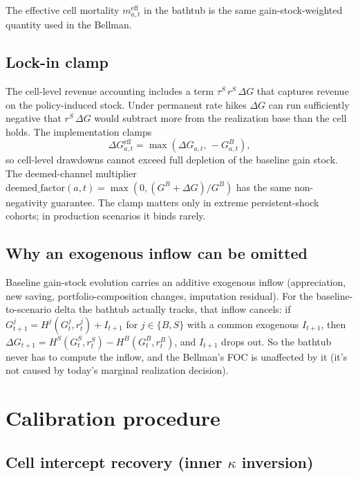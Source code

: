 \documentclass[11pt]{article}
\begin{document}
The effective cell mortality $m^{\text{eff}}_{a,t}$ in the bathtub is the
same gain-stock-weighted quantity used in the Bellman.

\subsection{Lock-in clamp}

The cell-level revenue accounting includes a term
$\tau^S\,r^S\,\Delta G$ that captures revenue on the policy-induced stock.
Under permanent rate hikes $\Delta G$ can run sufficiently negative that
$r^S\,\Delta G$ would subtract more from the realization base than the cell
holds. The implementation clamps
\begin{equation}
\Delta G^{\text{eff}}_{a,t} = \max\!\left(\Delta G_{a,t},\, -G^B_{a,t}\right),
\label{eq:clamp}
\end{equation}
so cell-level drawdowns cannot exceed full depletion of the baseline gain
stock. The deemed-channel multiplier
$\mathrm{deemed\_factor}(a,t) = \max(0, (G^B + \Delta G)/G^B)$ has the same
non-negativity guarantee. The clamp matters only in extreme persistent-shock
cohorts; in production scenarios it binds rarely.

\subsection{Why an exogenous inflow can be omitted}

Baseline gain-stock evolution carries an additive exogenous inflow
(appreciation, new saving, portfolio-composition changes, imputation
residual). For the baseline-to-scenario delta the bathtub actually
tracks, that inflow cancels: if
$G^j_{t+1} = H^j(G^j_t, r^j_t) + I_{t+1}$ for $j \in \{B, S\}$ with a
common exogenous $I_{t+1}$, then
$\Delta G_{t+1} = H^S(G^S_t, r^S_t) - H^B(G^B_t, r^B_t)$, and $I_{t+1}$
drops out. So the bathtub never has to compute the inflow, and the
Bellman's FOC is unaffected by it (it's not caused by today's marginal
realization decision).

\section{Calibration procedure}
\label{app:calib}

\subsection{Cell intercept recovery (inner $\kappa$ inversion)}
\end{document}
